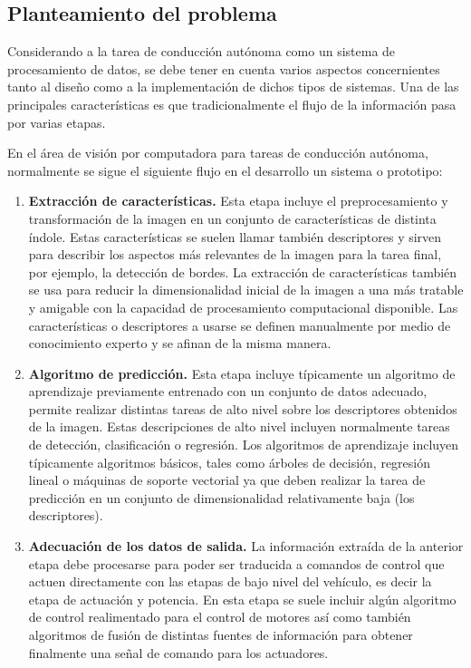 \documentclass[12pt,letterpaper]{article}
\begin{document}
\subsection{Planteamiento del problema}

Considerando a la tarea de conducción autónoma como un sistema de procesamiento de datos, se debe tener en 
cuenta varios aspectos concernientes tanto al diseño como a la implementación de dichos tipos de sistemas. Una 
de las principales características es que tradicionalmente el flujo de la información pasa por varias etapas.

En el área de visión por computadora para tareas de conducción autónoma, normalmente se sigue el siguiente flujo en el desarrollo 
un sistema o prototipo:

\begin{enumerate}
    \item \textbf{Extracción de características.} Esta etapa incluye el preprocesamiento y transformación de la imagen 
    en un conjunto de características de distinta índole. Estas características se suelen llamar también descriptores 
    y sirven para describir los aspectos más relevantes de la imagen para la tarea final, por ejemplo, la detección de bordes. 
    La extracción de características también se usa para reducir la dimensionalidad inicial de la imagen a una más tratable y 
    amigable con la capacidad de procesamiento computacional disponible. Las características o descriptores a usarse 
    se definen manualmente por medio de conocimiento experto y se afinan de la misma manera.

    \item \textbf{Algoritmo de predicción.} Esta etapa incluye típicamente un algoritmo de aprendizaje previamente 
    entrenado con un conjunto de datos adecuado, permite realizar distintas tareas de alto nivel sobre los descriptores 
    obtenidos de la imagen. Estas descripciones de alto nivel incluyen normalmente tareas de detección, 
    clasificación o regresión. Los algoritmos de aprendizaje incluyen típicamente algoritmos básicos, tales como árboles de decisión,
    regresión lineal o máquinas de soporte vectorial ya que deben realizar la tarea de predicción en un 
    conjunto de dimensionalidad relativamente baja (los descriptores).

    \item \textbf{Adecuación de los datos de salida.} La información extraída de la anterior etapa debe 
    procesarse para poder ser traducida a comandos de control que actuen directamente con las etapas 
    de bajo nivel del vehículo, es decir la etapa de actuación y potencia. En esta etapa se suele incluir algún algoritmo 
    de control realimentado para el control de motores así como también algoritmos de fusión de distintas fuentes de información
    para obtener finalmente una señal de comando para los actuadores.
\end{enumerate}
\end{document}
